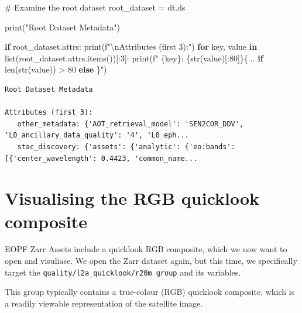 \documentclass[
  letterpaper,
  DIV=11,
  numbers=noendperiod]{scrreprt}
\newenvironment{Shaded}{\begin{snugshade}}{\end{snugshade}}
\newcommand{\BuiltInTok}[1]{\textcolor[rgb]{0.00,0.23,0.31}{#1}}
\newcommand{\CharTok}[1]{\textcolor[rgb]{0.13,0.47,0.30}{#1}}
\newcommand{\CommentTok}[1]{\textcolor[rgb]{0.37,0.37,0.37}{#1}}
\newcommand{\ControlFlowTok}[1]{\textcolor[rgb]{0.00,0.23,0.31}{\textbf{#1}}}
\newcommand{\DecValTok}[1]{\textcolor[rgb]{0.68,0.00,0.00}{#1}}
\newcommand{\KeywordTok}[1]{\textcolor[rgb]{0.00,0.23,0.31}{\textbf{#1}}}
\newcommand{\NormalTok}[1]{\textcolor[rgb]{0.00,0.23,0.31}{#1}}
\newcommand{\OperatorTok}[1]{\textcolor[rgb]{0.37,0.37,0.37}{#1}}
\newcommand{\SpecialCharTok}[1]{\textcolor[rgb]{0.37,0.37,0.37}{#1}}
\newcommand{\SpecialStringTok}[1]{\textcolor[rgb]{0.13,0.47,0.30}{#1}}
\newcommand{\StringTok}[1]{\textcolor[rgb]{0.13,0.47,0.30}{#1}}
\begin{document}
\begin{Shaded}
\begin{Highlighting}[]
\CommentTok{\# Examine the root dataset}
\NormalTok{root\_dataset }\OperatorTok{=}\NormalTok{ dt.ds}

\BuiltInTok{print}\NormalTok{(}\StringTok{"Root Dataset Metadata"}\NormalTok{)}

\ControlFlowTok{if}\NormalTok{ root\_dataset.attrs:}
    \BuiltInTok{print}\NormalTok{(}\SpecialStringTok{f"}\CharTok{\textbackslash{}n}\SpecialStringTok{Attributes (first 3):"}\NormalTok{)}
    \ControlFlowTok{for}\NormalTok{ key, value }\KeywordTok{in} \BuiltInTok{list}\NormalTok{(root\_dataset.attrs.items())[:}\DecValTok{3}\NormalTok{]:}
        \BuiltInTok{print}\NormalTok{(}\SpecialStringTok{f"   }\SpecialCharTok{\{}\NormalTok{key}\SpecialCharTok{\}}\SpecialStringTok{: }\SpecialCharTok{\{}\BuiltInTok{str}\NormalTok{(value)[:}\DecValTok{80}\NormalTok{]}\SpecialCharTok{\}\{}\StringTok{\textquotesingle{}...\textquotesingle{}} \ControlFlowTok{if} \BuiltInTok{len}\NormalTok{(}\BuiltInTok{str}\NormalTok{(value)) }\OperatorTok{\textgreater{}} \DecValTok{80} \ControlFlowTok{else} \StringTok{\textquotesingle{}\textquotesingle{}}\SpecialCharTok{\}}\SpecialStringTok{"}\NormalTok{)}
\end{Highlighting}
\end{Shaded}

\begin{verbatim}
Root Dataset Metadata

Attributes (first 3):
   other_metadata: {'AOT_retrieval_model': 'SEN2COR_DDV', 'L0_ancillary_data_quality': '4', 'L0_eph...
   stac_discovery: {'assets': {'analytic': {'eo:bands': [{'center_wavelength': 0.4423, 'common_name...
\end{verbatim}

\section{Visualising the RGB quicklook
composite}\label{visualising-the-rgb-quicklook-composite}

EOPF Zarr Assets include a quicklook RGB composite, which we now want to
open and visuliase. We open the Zarr dataset again, but this time, we
specifically target the \texttt{quality/l2a\_quicklook/r20m\ group} and
its variables.

This group typically contains a true-colour (RGB) quicklook composite,
which is a readily viewable representation of the satellite image.
\end{document}
